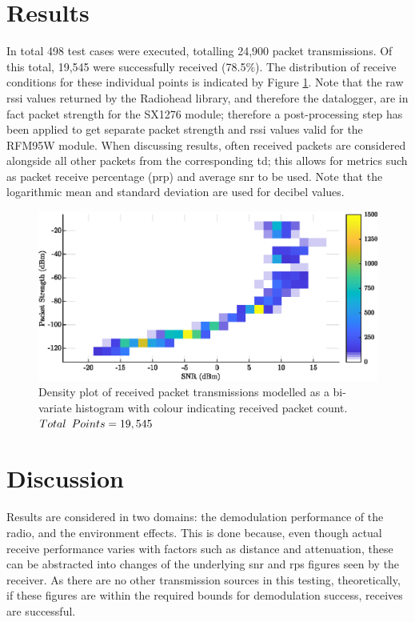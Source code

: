 \section{Results}
In total 498 test cases were executed, totalling 24,900 packet transmissions. Of this total, 19,545 were successfully received (78.5\%). The distribution of receive conditions for these individual points is indicated by Figure \ref{fig:density_plot}. Note that the raw \ac{rssi} values returned by the Radiohead library, and therefore the datalogger, are in fact packet strength for the SX1276 module; therefore a post-processing step has been applied to get separate packet strength and \ac{rssi} values valid for the RFM95W module. When discussing results, often received packets are considered alongside all other packets from the corresponding \ac{td}; this allows for metrics such as packet receive percentage (\ac{prp}) and average \ac{snr} to be used. Note that the logarithmic mean and standard deviation are used for decibel values.

\begin{figure}[H]
    \centering
   	\includegraphics{Figures/density_plot}
    \caption[Test data distribution plot]{
    Density plot of received packet transmissions modelled as a bi-variate histogram with colour indicating received packet count. \\$Total\enskip Points = 19,545$
    }
    \label{fig:density_plot}
\end{figure}

\section{Discussion}
Results are considered in two domains: the demodulation performance of the radio, and the environment effects. This is done because, even though actual receive performance varies with factors such as distance and attenuation, these can be abstracted into changes of the underlying \ac{snr} and \ac{rps} figures seen by the receiver. As there are no other transmission sources in this testing, theoretically, if these figures are within the required bounds for demodulation success, receives are successful.

